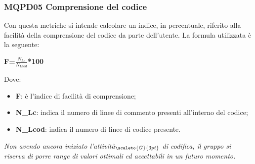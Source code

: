 \subsubsection{MQPD05 Comprensione del codice}\label{QualitàDelProdottoManutenibilitàMetricheMQPD05}
Con questa metriche si intende calcolare un indice, in percentuale, riferito alla facilità della comprensione del codice da parte dell'utente.
La formula utilizzata è la seguente:
\begin{center}
	\textbf{F=$\frac{N_{Lc}}{N_{Lcod}}$*100}
\end{center}
Dove:
\begin{itemize}
	\item \textbf{F}: è l'indice di facilità di comprensione;
	\item \textbf{N\_{Lc}}: indica il numero di linee di commento presenti all'interno del codice;
	\item \textbf{N\_{Lcod}}: indica il numero di linee di codice presente.
\end{itemize}

\textit{Non avendo ancora iniziato l'attività$_{\scaleto{G}{3pt}}$ di codifica, il gruppo si riserva di porre range di valori ottimali ed accettabili in un futuro momento.}